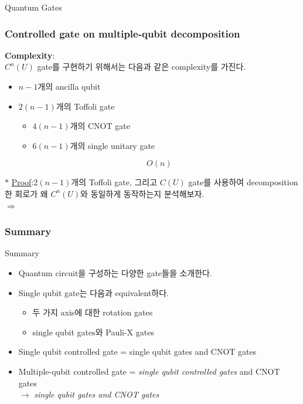 \documentclass[9pt]{beamer}
\begin{document}
\begin{section}{Quantum Gates}
        \begin{frame}
            \frametitle{Controlled gate on multiple-qubit decomposition}
                \textbf{Complexity}:
                \\ $C^n(U)$ gate를 구현하기 위해서는 다음과 같은 complexity를 가진다.
                \begin{itemize}
                    \item $n-1$개의 ancilla qubit
                    \item $2(n-1)$개의 Toffoli gate 
                    \begin{itemize}
                        \item $4(n-1)$개의 CNOT gate
                        \item $6(n-1)$개의 single unitary gate
                    \end{itemize}
                    $$O(n) $$
                \end{itemize}
                
                \vspace{0.4cm}
                $\ast$ \underline{Proof}:$2(n-1)$개의 Toffoli gate, 그리고 $C(U)$ gate를 사용하여 decomposition한 회로가 왜 $C^n(U)$와 동일하게 동작하는지 분석해보자.
                \\ $\Rightarrow$
                \vspace{2cm}
        \end{frame}

        \begin{frame}
            \frametitle{Summary}
            \begin{block}{Summary}
                \begin{itemize}
                    \item  Quantum circuit을 구성하는 다양한 gate들을 소개한다.
                    \item  Single qubit gate는 다음과 equivalent하다.
                    \begin{itemize}
                        \item 두 가지 axis에 대한 rotation gates
                        \item single qubit gates와 Pauli-X gates
                    \end{itemize}
                    
                    \item  Single qubit controlled gate = single qubit gates and CNOT gates
                    \item  Multiple-qubit controlled gate = \textit{single qubit controlled gates} and CNOT gates
                    \\ $\rightarrow$ \textit{single qubit gates and CNOT gates}
                    

\end{itemize}
\end{block}
\end{frame}
\end{section}
\end{document}
